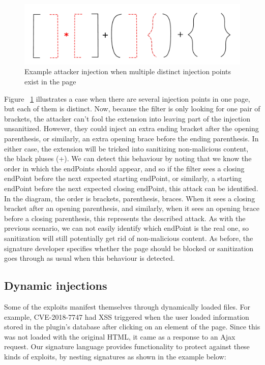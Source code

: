 \begin{figure}[h]
	\includegraphics[scale=0.25]{img/attacker_injection_unique.pdf}
	\caption{Example attacker injection when multiple distinct injection points exist in the page}
	\label{fig:attacker_injection_unique}
\end{figure}


Figure ~\ref{fig:attacker_injection_unique} illustrates a case when there are several injection points in one page, but each of them is distinct. Now, because the filter is only looking for one pair of brackets, the attacker can't fool the extension into leaving part of the injection unsanitized. However, they could inject an extra ending bracket after the opening parenthesis, or similarly, an extra opening brace before the ending parenthesis. In either case, the extension will be tricked into sanitizing non-malicious content, the black pluses (+). We can detect this behaviour by noting that we know the order in which the endPoints should appear, and so if the filter sees a closing endPoint before the next expected starting endPoint, or similarly, a starting endPoint before the next expected closing endPoint, this attack can be identified. In the diagram, the order is brackets, parenthesis, braces. When it sees a closing bracket after an opening parenthesis, and similarly, when it sees an opening brace before a closing parenthesis, this represents the described attack. As with the previous scenario, we can not easily identify which endPoint is the real one, so sanitization will still potentially get rid of non-malicious content. As before, the signature developer specifies whether the page should be blocked or sanitization goes through as usual when this behaviour is detected.

\subsection{Dynamic injections} \label{dynamic_injections}
Some of the exploits manifest themselves through dynamically loaded files. For example, CVE-2018-7747 had XSS triggered when the user loaded information stored in the plugin's database after clicking on an element of the page. Since this was not loaded with the original HTML, it came as a response to an Ajax request. Our signature language provides functionality to protect against these kinds of exploits, by nesting signatures as shown in the example below:

